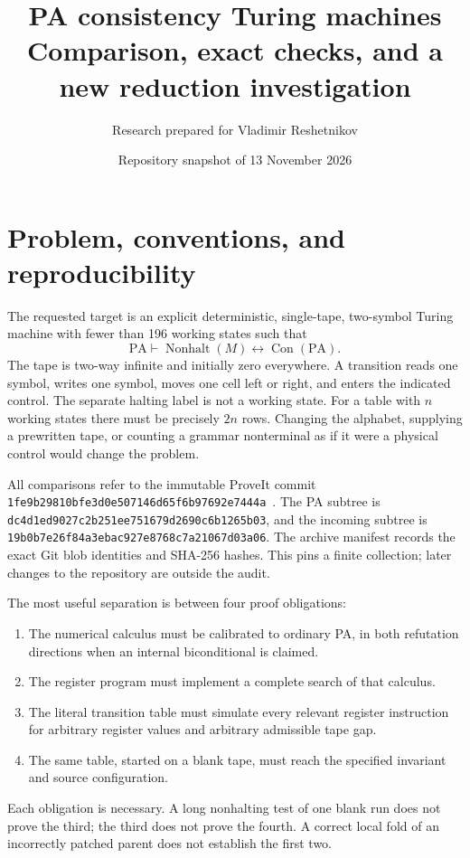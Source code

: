 \documentclass[11pt,a4paper]{article}
\title{PA consistency Turing machines\\\large Comparison, exact checks, and a new reduction investigation}
\author{Research prepared for Vladimir Reshetnikov}
\date{Repository snapshot of 13 November 2026}
\newcommand{\PA}{\mathrm{PA}}
\newcommand{\Con}{\operatorname{Con}}
\newcommand{\Nonhalt}{\operatorname{Nonhalt}}
\newcommand{\file}[1]{\texttt{\nolinkurl{#1}}}
\newcommand{\pin}{\nolinkurl{1fe9b29810bfe3d0e507146d65f6b97692e7444a}}
\begin{document}
\maketitle

\begingroup\small\setlength{\parskip}{0pt}\tableofcontents\endgroup
\clearpage

\section{Problem, conventions, and reproducibility}

The requested target is an explicit deterministic, single-tape, two-symbol
Turing machine with fewer than 196 working states such that
\[
   \PA\vdash\Nonhalt(M)\longleftrightarrow\Con(\PA).
\]
The tape is two-way infinite and initially zero everywhere. A transition
reads one symbol, writes one symbol, moves one cell left or right, and enters
the indicated control. The separate halting label is not a working state.
For a table with $n$ working states there must be precisely $2n$ rows.
Changing the alphabet, supplying a prewritten tape, or counting a grammar
nonterminal as if it were a physical control would change the problem.

All comparisons refer to the immutable ProveIt commit \pin~\cite{repo,incoming}. The PA subtree
is \file{dc4d1ed9027c2b251ee751679d2690c6b1265b03}, and the incoming subtree
is \file{19b0b7e26f84a3ebac927e8768c7a21067d03a06}. The archive manifest
records the exact Git blob identities and SHA-256 hashes. This pins a finite
collection; later changes to the repository are outside the audit.

The most useful separation is between four proof obligations:
\begin{enumerate}
\item The numerical calculus must be calibrated to ordinary PA, in both
  refutation directions when an internal biconditional is claimed.
\item The register program must implement a complete search of that calculus.
\item The literal transition table must simulate every relevant register
  instruction for arbitrary register values and arbitrary admissible tape gap.
\item The same table, started on a blank tape, must reach the specified
  invariant and source configuration.
\end{enumerate}
Each obligation is necessary. A long nonhalting test of one blank run does
not prove the third; the third does not prove the fourth. A correct local
fold of an incorrectly patched parent does not establish the first two.
\end{document}
